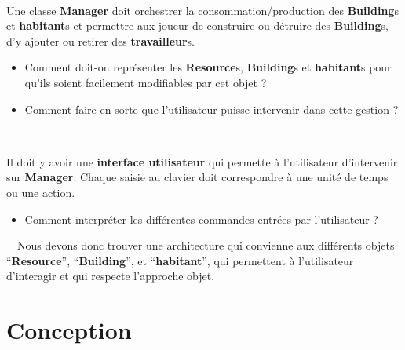 \documentclass{article}
\begin{document}
\ \
\par Une classe \textbf{Manager} doit orchestrer la consommation/production des \textbf{Building}s et \textbf{habitant}s et permettre aux joueur de construire ou détruire des \textbf{Building}s, d'y ajouter ou retirer des \textbf{travailleur}s.
\begin{itemize}
    \item Comment doit-on représenter les \textbf{Resource}s, \textbf{Building}s et \textbf{habitant}s pour qu’ils soient facilement modifiables par cet objet ? 
    \item Comment faire en sorte que l’utilisateur puisse intervenir dans cette gestion ?
\end{itemize}
\ \
\par Il doit y avoir une \textbf{interface utilisateur} qui permette à l'utilisateur d’intervenir sur \textbf{Manager}. Chaque saisie au clavier doit correspondre à une unité de temps ou une action. 
\begin{itemize}
    \item Comment interpréter les différentes commandes entrées par l’utilisateur ?
\end{itemize}
\ \
Nous devons donc trouver une architecture qui convienne aux différents objets “\textbf{Resource}”, “\textbf{Building}”, et “\textbf{habitant}”, qui permettent à l'utilisateur d'interagir et qui respecte l’approche objet.

\section*{Conception}
\end{document}
